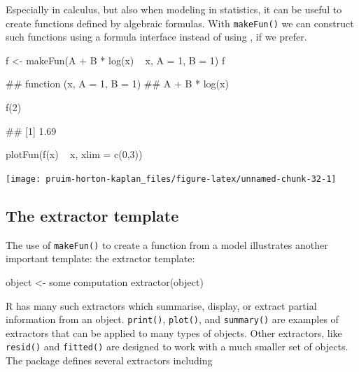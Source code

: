 Especially in calculus, but also when modeling in statistics, it can be
useful to create functions defined by algebraic formulas. With
\texttt{makeFun()} we can construct such functions using a formula
interface instead of using , if we prefer.

\begin{Schunk}
\begin{Sinput}
f <- makeFun(A + B * log(x) ~ x, A = 1, B = 1)
f
\end{Sinput}
\begin{Soutput}
## function (x, A = 1, B = 1) 
## A + B * log(x)
\end{Soutput}
\begin{Sinput}
f(2)
\end{Sinput}
\begin{Soutput}
## [1] 1.69
\end{Soutput}
\begin{Sinput}
plotFun(f(x) ~ x, xlim = c(0,3))
\end{Sinput}


\begin{center}\texttt{[image: pruim-horton-kaplan\_files/figure-latex/unnamed-chunk-32-1]} \end{center}

\end{Schunk}

\subsection{The extractor template}\label{the-extractor-template}

The use of \texttt{makeFun()} to create a function from a model
illustrates another important template: the extractor template:

\begin{Schunk}
\begin{Sinput}
object <- { some computation }
extractor(object)
\end{Sinput}
\end{Schunk}

R has many such extractors which summarise, display, or extract partial
information from an object. \texttt{print()}, \texttt{plot()}, and
\texttt{summary()} are examples of extractors that can be applied to
many types of objects. Other extractors, like \texttt{resid()} and
\texttt{fitted()} are designed to work with a much smaller set of
objects. The  package defines several extractors including


